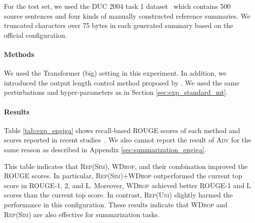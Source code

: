 \documentclass[11pt]{article}
\newcommand{\uniform}{\textsc{Rep(Uni)}}
\newcommand{\similarity}{\textsc{Rep(Sim)}}
\newcommand{\worddrop}{\textsc{WDrop}}
\newcommand{\adv}{\textsc{Adv}}
\begin{document}
For the test set, we used the DUC 2004 task 1 dataset~\cite{Over:2007:DC:1284916.1285157} which contains 500 source sentences and four kinds of manually constructed reference summaries.
We truncated characters over 75 bytes in each generated summary based on the official configuration.

\paragraph{Methods}
We used the Transformer (big) setting in this experiment.
In addition, we introduced the output length control method proposed by .
We used the same perturbations and hyper-parameters as in Section \ref{sec:exp_standard_mt}.

\paragraph{Results}
Table \ref{tab:exp_engiga} shows recall-based ROUGE scores of each method and scores reported in recent studies~\cite{rush-chopra-weston:2015:EMNLP,suzuki-nagata-2017-cutting,takase-okazaki-2019-positional,takase2020word}.
We also cannot report the result of \adv{} for the same reason as described in Appendix \ref{sec:summarization_engiga}.

This table indicates that \similarity{}, \worddrop{}, and their combination improved the ROUGE scores.
In particular, \similarity{}+\worddrop{} outperformed the current top score in ROUGE-1, 2, and L.
Moreover, \worddrop{} achieved better ROUGE-1 and L scores than the current top score.
In contrast, \uniform{} slightly harmed the performance in this configuration.
These results indicate that \worddrop{} and \similarity{} are also effective for summarization tasks.
\end{document}
